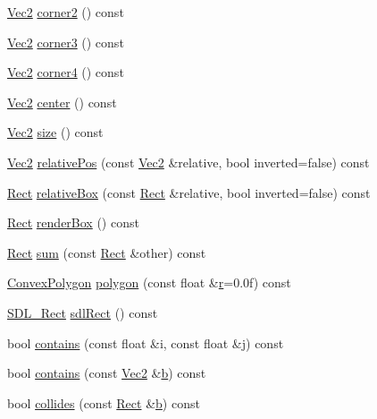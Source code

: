 \begin{DoxyCompactItemize}
\hyperlink{class_vec2}{Vec2} \hyperlink{class_rect_abd6c25913c5c75a2e738c70fe6e988ec}{corner2} () const 
\item 
\hyperlink{class_vec2}{Vec2} \hyperlink{class_rect_aeafebafb973ca24e53b97e2812c11b65}{corner3} () const 
\item 
\hyperlink{class_vec2}{Vec2} \hyperlink{class_rect_aa758c58c5ed8ae72e05d5528f70716c9}{corner4} () const 
\item 
\hyperlink{class_vec2}{Vec2} \hyperlink{class_rect_a399133183d62faf27cf9f6a067ecbde8}{center} () const 
\item 
\hyperlink{class_vec2}{Vec2} \hyperlink{class_rect_a0c65ca8616dab0ca48265e4c4fd57bda}{size} () const 
\item 
\hyperlink{class_vec2}{Vec2} \hyperlink{class_rect_a51447e7649f9aacaa4ad6d8ac4ba56c6}{relative\-Pos} (const \hyperlink{class_vec2}{Vec2} \&relative, bool inverted=false) const 
\item 
\hyperlink{class_rect}{Rect} \hyperlink{class_rect_a992875dac7444b3025da2e0ff52e5015}{relative\-Box} (const \hyperlink{class_rect}{Rect} \&relative, bool inverted=false) const 
\item 
\hyperlink{class_rect}{Rect} \hyperlink{class_rect_a09e61841f27b9dd8f4e3fb19f76cb4b1}{render\-Box} () const 
\item 
\hyperlink{class_rect}{Rect} \hyperlink{class_rect_a6a0e5c3500e130e0c07313d8bb338de2}{sum} (const \hyperlink{class_rect}{Rect} \&other) const 
\item 
\hyperlink{class_convex_polygon}{Convex\-Polygon} \hyperlink{class_rect_a6b4d62e48b067f33c374402379d995e1}{polygon} (const float \&\hyperlink{_s_d_l__opengl_8h_a42ce7cdc612e53abee15043f80220d97}{r}=0.\-0f) const 
\item 
\hyperlink{struct_s_d_l___rect}{S\-D\-L\-\_\-\-Rect} \hyperlink{class_rect_ac037668e744ad67e8ac1ca30c1dbcaa2}{sdl\-Rect} () const 
\item 
bool \hyperlink{class_rect_a0f67a1f4c9831d86be559e630a091c56}{contains} (const float \&i, const float \&j) const 
\item 
bool \hyperlink{class_rect_a0d5cd79b3d61780d9d296d450a2089e9}{contains} (const \hyperlink{class_vec2}{Vec2} \&\hyperlink{_s_d_l__opengl__glext_8h_a0f71581a41fd2264c8944126dabbd010}{b}) const 
\item 
bool \hyperlink{class_rect_a067208bf4f1aba821c122d3ed8dce538}{collides} (const \hyperlink{class_rect}{Rect} \&\hyperlink{_s_d_l__opengl__glext_8h_a0f71581a41fd2264c8944126dabbd010}{b}) const 
\end{DoxyCompactItemize}
